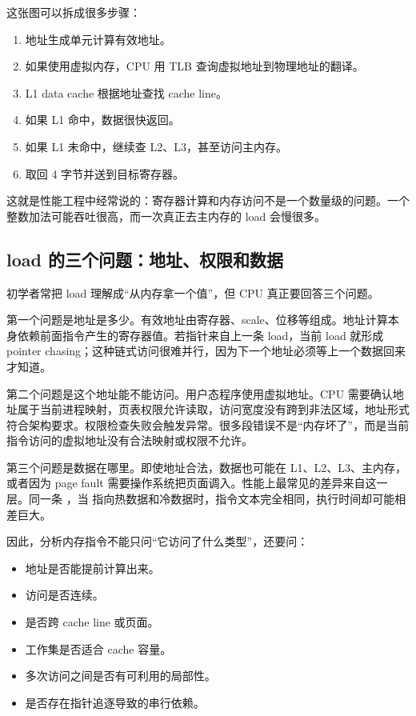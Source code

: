 这张图可以拆成很多步骤：

\begin{enumerate}
  \item 地址生成单元计算有效地址。
  \item 如果使用虚拟内存，CPU 用 TLB 查询虚拟地址到物理地址的翻译。
  \item L1 data cache 根据地址查找 cache line。
  \item 如果 L1 命中，数据很快返回。
  \item 如果 L1 未命中，继续查 L2、L3，甚至访问主内存。
  \item 取回 4 字节并送到目标寄存器。
\end{enumerate}

这就是性能工程中经常说的：寄存器计算和内存访问不是一个数量级的问题。一个整数加法可能吞吐很高，而一次真正去主内存的 load 会慢很多。

\subsection{load 的三个问题：地址、权限和数据}

初学者常把 load 理解成“从内存拿一个值”，但 CPU 真正要回答三个问题。

第一个问题是地址是多少。有效地址由寄存器、scale、位移等组成。地址计算本身依赖前面指令产生的寄存器值。若指针来自上一条 load，当前 load 就形成 pointer chasing；这种链式访问很难并行，因为下一个地址必须等上一个数据回来才知道。

第二个问题是这个地址能不能访问。用户态程序使用虚拟地址。CPU 需要确认地址属于当前进程映射，页表权限允许读取，访问宽度没有跨到非法区域，地址形式符合架构要求。权限检查失败会触发异常。很多段错误不是“内存坏了”，而是当前指令访问的虚拟地址没有合法映射或权限不允许。

第三个问题是数据在哪里。即使地址合法，数据也可能在 L1、L2、L3、主内存，或者因为 page fault 需要操作系统把页面调入。性能上最常见的差异来自这一层。同一条 ，当  指向热数据和冷数据时，指令文本完全相同，执行时间却可能相差巨大。

因此，分析内存指令不能只问“它访问了什么类型”，还要问：

\begin{itemize}
  \item 地址是否能提前计算出来。
  \item 访问是否连续。
  \item 是否跨 cache line 或页面。
  \item 工作集是否适合 cache 容量。
  \item 多次访问之间是否有可利用的局部性。
  \item 是否存在指针追逐导致的串行依赖。
\end{itemize}


